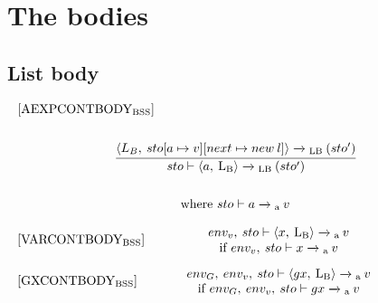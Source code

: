 \section{The bodies}
\subsection{List body}\label{APP:ListBody}
\begin{equation}
\begin{split}
\begin{minipage}{\linewidth}
$[\text{AEXPCONTBODY}_\text{BSS}]$
\end{minipage}
\\\\
\begin{minipage}{\linewidth}
\centering
$\cfrac{\langle L_B, \: sto[a \mapsto v][next \mapsto new \: l]\rangle \xrightarrow{}\textsubscript{LB} \: (sto') }{sto \vdash \langle a, \: \text{L\textsubscript{B}} \rangle \xrightarrow{}\textsubscript{LB} \: (sto')}$
\end{minipage}
\\\\
\begin{minipage}{\linewidth}
\centering
where $sto \vdash a \xrightarrow{}\textsubscript{a} \: v$
\end{minipage}
\end{split}
\end{equation}

\begin{equation}
\begin{minipage}{.2\linewidth}
$[\text{VARCONTBODY}_\text{BSS}]$
\end{minipage}
\\
\begin{minipage}{.8\linewidth}
\centering
$env_v, \: sto \vdash \langle x, \: \text{L\textsubscript{B}} \rangle \xrightarrow{}\textsubscript{a} \: v $
\\
if $env_v, \: sto \vdash x \xrightarrow{} \textsubscript{a} \: v$
\end{minipage}
\end{equation}

\begin{equation}
\begin{minipage}{.2\linewidth}
$[\text{GXCONTBODY}_\text{BSS}]$
\end{minipage}
\\
\begin{minipage}{.8\linewidth}
\centering
$env_G, \: env_v, \: sto \vdash \langle gx, \: \text{L\textsubscript{B}} \rangle \xrightarrow{}\textsubscript{a} \: v $
\\
if $env_G, \: env_v, \: sto \vdash gx \xrightarrow{}\textsubscript{a} \: v$
\end{minipage}
\end{equation}


